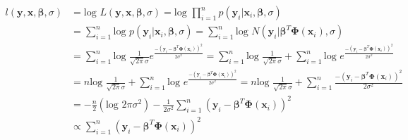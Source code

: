 \documentclass[a4paper,10pt]{article}
\begin{document}
\begin{equation}
 \begin{split}
  l(\bm{y}, \bm{x},\bm{\beta},\sigma) & = \text{log } L(\bm{y}, \bm{x},\bm{\beta},\sigma) = \text{log } \prod_{i=1}^{n} p(\bm{y}_i | \bm{x}_i, \bm{\beta}, \sigma)\\
  & =  \sum_{i=1}^{n}  \text{log } p(\bm{y}_i | \bm{x}_i, \bm{\beta}, \sigma) = \sum_{i=1}^{n} \text{log } N(\bm{y}_i | \bm{\beta}^T \bm{\Phi}(\bm{x}_i), \sigma)  \\
  & =  \sum_{i=1}^{n} \text{log }  \frac{1}{\sqrt{2\pi}\sigma} e^{\frac{-(\bm{y}_i - \bm{\beta}^T\bm{\Phi}(\bm{x}_i))^2}{2\sigma^2} } = \sum_{i=1}^{n} \text{log } \frac{1}{\sqrt{2\pi}\sigma} + \sum_{i=1}^{n} \text{log } e^{\frac{-(\bm{y}_i - \bm{\beta}^T\bm{\Phi}(\bm{x}_i))^2}{2\sigma^2} } \\
  & = n \text{log } \frac{1}{\sqrt{2\pi}\sigma} + \sum_{i=1}^{n} \text{log } e^{\frac{-(\bm{y}_i - \bm{\beta}^T\bm{\Phi}(\bm{x}_i))^2}{2\sigma^2} } = n \text{log } \frac{1}{\sqrt{2\pi}\sigma} + \sum_{i=1}^{n}  \frac{-(\bm{y}_i - \bm{\beta}^T\bm{\Phi}(\bm{x}_i))^2}{2\sigma^2} \\
  &  = -\frac{n}{2} (\text{log } 2\pi\sigma^2) - \frac{1}{2\sigma^2} \sum_{i=1}^{n}  (\bm{y}_i - \bm{\beta}^T\bm{\Phi}(\bm{x}_i))^2 \\
  & \propto  \sum_{i=1}^{n}  (\bm{y}_i - \bm{\beta}^T\bm{\Phi}(\bm{x}_i))^2
 \end{split}
\end{equation}
\end{document}
